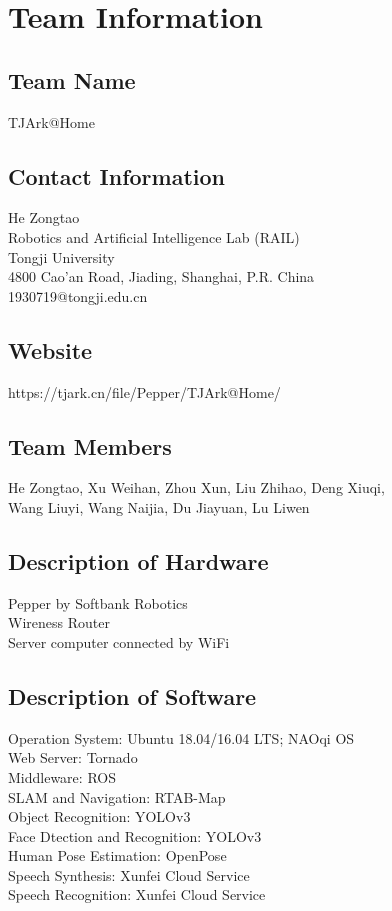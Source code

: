 \section{Team Information}
\label{sec:team}

\subsection*{Team Name}
TJArk@Home

\subsection*{Contact Information}
He Zongtao \\
Robotics and Artificial Intelligence Lab (RAIL) \\
Tongji University \\
4800 Cao'an Road, Jiading, Shanghai, P.R. China \\
1930719@tongji.edu.cn 

\subsection*{Website}
https://tjark.cn/file/Pepper/TJArk@Home/

\subsection*{Team Members}
He Zongtao, Xu Weihan, Zhou Xun, Liu Zhihao, Deng Xiuqi, \\
Wang Liuyi, Wang Naijia, Du Jiayuan, Lu Liwen

\subsection*{Description of Hardware}
Pepper by Softbank Robotics \\
Wireness Router \\
Server computer connected by WiFi \\

\subsection*{Description of Software}
Operation System: Ubuntu 18.04/16.04 LTS; NAOqi OS \\
Web Server: Tornado \\
Middleware: ROS \\
SLAM and Navigation: RTAB-Map \\
Object Recognition: YOLOv3 \\
Face Dtection and Recognition: YOLOv3 \\
Human Pose Estimation:  OpenPose \\
Speech Synthesis: Xunfei Cloud Service\\
Speech Recognition: Xunfei Cloud Service \\